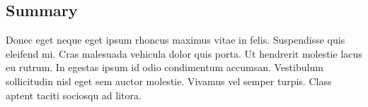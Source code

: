 \subsection{Summary}

{

\setlength{\parindent}{2ex}

\par Donec eget neque eget ipsum rhoncus maximus vitae in felis. Suspendisse quis eleifend mi. Cras malesuada vehicula dolor quis porta. Ut hendrerit molestie lacus eu rutrum. In egestas ipsum id odio condimentum accumsan. Vestibulum sollicitudin nisl eget sem auctor molestie. Vivamus vel semper turpis. Class aptent taciti sociosqu ad litora.

}
